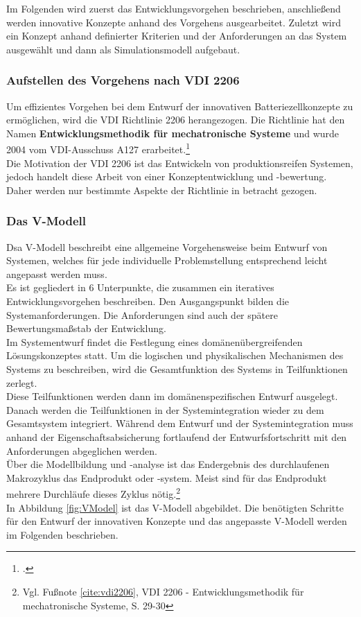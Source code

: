 Im Folgenden wird zuerst das Entwicklungsvorgehen beschrieben, anschließend werden innovative Konzepte anhand des Vorgehens ausgearbeitet. Zuletzt wird ein Konzept anhand definierter Kriterien und der Anforderungen an das System ausgewählt und dann als Simulationsmodell aufgebaut.

\subsubsection{Aufstellen des Vorgehens nach VDI 2206}\label{subsub:vorgehennachVDI}

Um effizientes Vorgehen bei dem Entwurf der innovativen Batteriezellkonzepte zu ermöglichen, wird die VDI Richtlinie 2206 herangezogen. Die Richtlinie hat den Namen \textbf{Entwicklungsmethodik für mechatronische Systeme} und wurde 2004 vom VDI-Ausschuss A127 erarbeitet.\footcite[Vgl.\label{cite:vdi2206}][S. 3]{VDI2206.June2004}\\
Die Motivation der VDI 2206 ist das Entwickeln von produktionsreifen Systemen, jedoch handelt diese Arbeit von einer Konzeptentwicklung und -bewertung. Daher werden nur bestimmte Aspekte der Richtlinie in betracht gezogen.\\

\subsubsection*{Das V-Modell}

Dsa V-Modell beschreibt eine allgemeine Vorgehensweise beim Entwurf von Systemen, welches für jede individuelle Problemstellung entsprechend leicht angepasst werden muss.\\
Es ist gegliedert in 6 Unterpunkte, die zusammen ein iteratives Entwicklungsvorgehen beschreiben. Den Ausgangspunkt bilden die Systemanforderungen. Die Anforderungen sind auch der spätere Bewertungsmaßstab der Entwicklung.\\
Im Systementwurf findet die Festlegung eines domänenübergreifenden Lösungskonzeptes statt. Um die logischen und physikalischen Mechanismen des Systems zu beschreiben, wird die Gesamtfunktion des Systems in Teilfunktionen zerlegt.\\
Diese Teilfunktionen werden dann im domänenspezifischen Entwurf ausgelegt. Danach werden die Teilfunktionen in der Systemintegration wieder zu dem Gesamtsystem integriert. Während dem Entwurf und der Systemintegration muss anhand der Eigenschaftsabsicherung fortlaufend der Entwurfsfortschritt mit den Anforderungen abgeglichen werden.\\
Über die Modellbildung und -analyse ist das Endergebnis des durchlaufenen Makrozyklus das Endprodukt oder -system. Meist sind für das Endprodukt mehrere Durchläufe dieses Zyklus nötig.\footnote{Vgl. Fußnote \ref{cite:vdi2206}, VDI 2206 - Entwicklungsmethodik für mechatronische Systeme, S. 29-30}\\
In Abbildung \ref{fig:VModel} ist das V-Modell abgebildet. Die benötigten Schritte für den Entwurf der innovativen Konzepte und das angepasste V-Modell werden im Folgenden beschrieben.

